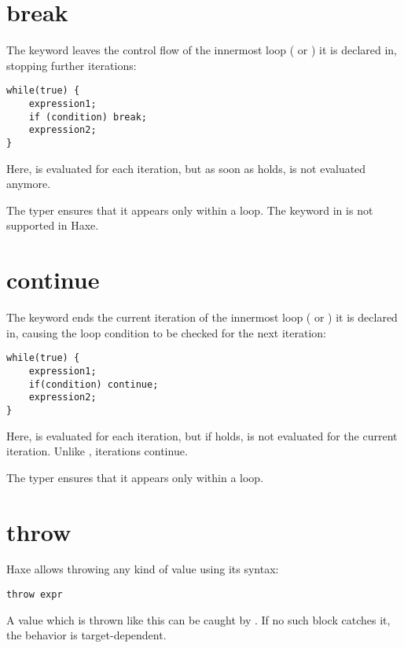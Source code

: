 \section{break}
\label{expression-break}

The  keyword leaves the control flow of the innermost loop ( or ) it is declared in, stopping further iterations:

\begin{lstlisting}
while(true) {
	expression1;
	if (condition) break;
	expression2;
}
\end{lstlisting}

Here,  is evaluated for each iteration, but as soon as  holds,  is not evaluated anymore.

The typer ensures that it appears only within a loop. The  keyword in  is not supported in Haxe.


\section{continue}
\label{expression-continue}

The  keyword ends the current iteration of the innermost loop ( or ) it is declared in, causing the loop condition to be checked for the next iteration:

\begin{lstlisting}
while(true) {
	expression1;
	if(condition) continue;
	expression2;
}
\end{lstlisting}

Here,  is evaluated for each iteration, but if  holds,  is not evaluated for the current iteration. Unlike , iterations continue.

The typer ensures that it appears only within a loop.


\section{throw}
\label{expression-throw}

Haxe allows throwing any kind of value using its  syntax:

\begin{lstlisting}
throw expr
\end{lstlisting}

A value which is thrown like this can be caught by . If no such block catches it, the behavior is target-dependent.


